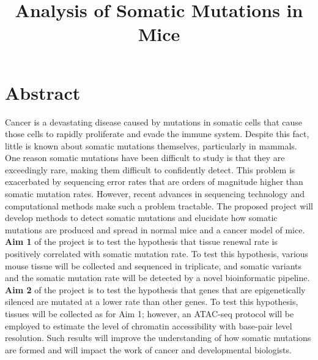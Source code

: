 \documentclass[12pt]{article}
\title{Analysis of Somatic Mutations in Mice}
\date{}
\begin{document}
\maketitle





\section{Abstract}

Cancer is a devastating disease caused by mutations in somatic cells that cause those cells to rapidly proliferate and evade the immune system. Despite this fact, little is known about somatic mutations themselves, particularly in mammals.
One reason somatic mutations have been difficult to study is that they are exceedingly rare, making them difficult to confidently detect. This problem is exacerbated by sequencing error rates that are orders of magnitude higher than somatic mutation rates.
However, recent advances in sequencing technology and computational methods make such a problem tractable.
The proposed project will develop methods to detect somatic mutations and elucidate how somatic mutations are produced and spread in normal mice and a cancer model of mice.
\textbf{Aim 1} of the project is to test the hypothesis that tissue renewal rate is positively correlated with somatic mutation rate.
To test this hypothesis, various mouse tissue will be collected and sequenced in triplicate, and somatic variants and the somatic mutation rate will be detected by a novel bioinformatic pipeline. 
\textbf{Aim 2} of the project is to test the hypothesis that genes that are epigenetically silenced are mutated at a lower rate than other genes.
To test this hypothesis, tissues will be collected as for Aim 1; however, an ATAC-seq protocol will be employed to estimate the level of chromatin accessibility with base-pair level resolution.
Such results will improve the understanding of how somatic mutations are formed and will impact the work of cancer and developmental biologists.
\end{document}
